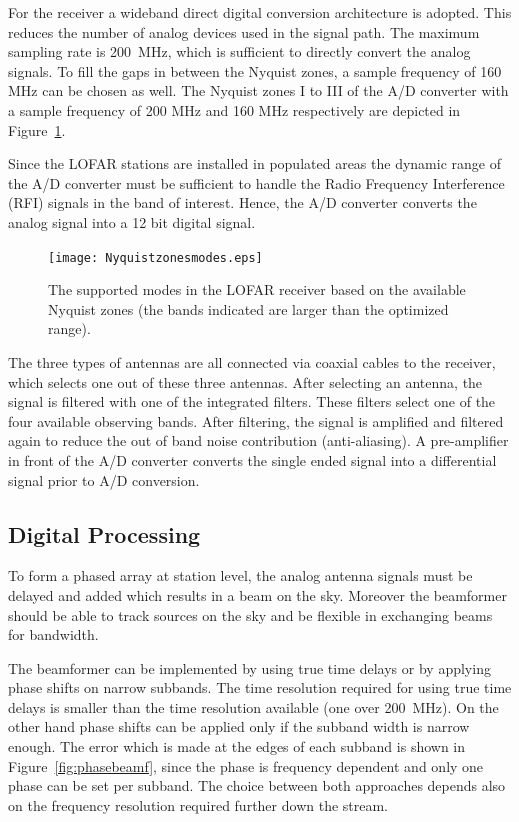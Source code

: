\documentclass[journal]{IEEEtran}
\begin{document}
For the receiver a wideband direct digital conversion architecture is adopted. This reduces the number of analog devices used in the signal path. The maximum sampling rate is 200~MHz, which is sufficient to directly convert the analog signals. To fill the gaps in between the Nyquist zones, a sample frequency of 160 MHz can be chosen as well. The Nyquist zones I to III of the A/D converter with a sample frequency of 200 MHz and 160 MHz respectively are depicted in Figure~\ref{fig:nyquistzones}. 

Since the LOFAR stations are installed in populated areas the dynamic range of the A/D converter must be sufficient to handle the Radio Frequency Interference (RFI) signals in the band of interest. Hence, the A/D converter converts the analog signal into a 12 bit digital signal. 

\begin{figure}
\begin{center}
\texttt{[image: Nyquistzonesmodes.eps]}
\end{center}
\caption{The supported modes in the LOFAR receiver based on the available Nyquist zones (the bands indicated are larger than the optimized range).}
\label{fig:nyquistzones}
\end{figure}

The three types of antennas are all connected via coaxial cables to the receiver, which selects one out of these three antennas. After selecting an antenna, the signal is filtered with one of the integrated filters. These filters select one of the four available observing bands. After filtering, the signal is amplified and filtered again to reduce the out of band noise contribution (anti-aliasing). A pre-amplifier in front of the A/D converter converts the single ended signal into a differential signal prior to A/D conversion. 

\subsection{Digital Processing}

To form a phased array at station level, the analog antenna signals must be delayed and added which results in a beam on the sky. Moreover the beamformer should be able to track sources on the sky and be flexible in exchanging beams for bandwidth. 

The beamformer can be implemented by using true time delays or by applying phase shifts on narrow subbands. The time resolution required for using true time delays is smaller than the time resolution available (one over 200~MHz). On the other hand phase shifts can be applied only if the subband width is narrow enough. The error which is made at the edges of each subband is shown in Figure~\ref{fig:phasebeamf}, since the phase is frequency dependent and only one phase can be set per subband. The choice between both approaches depends also on the frequency resolution required further down the stream.
\end{document}
